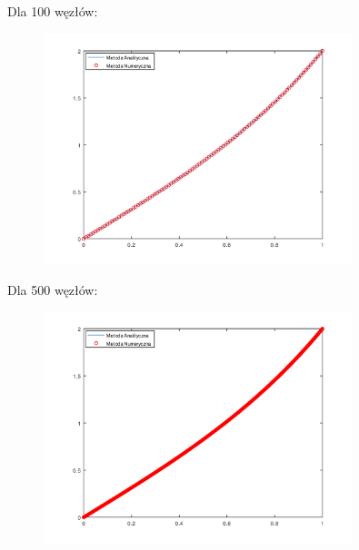 \newpage
\begin{samepage}
    
Dla 100 węzłów:
\begin{figure}[!ht]
    \begin{center}
    \includegraphics[width=0.8\textwidth]{Lab4/charts/zad1/zad1_n_100.png}
    \end{center}
\end{figure}
\FloatBarrier
\end{samepage}
    

    
\begin{samepage}

Dla 500 węzłów:

\begin{figure}[!ht]
    \begin{center}
\includegraphics[width=0.8\textwidth]{Lab4/charts/zad1/zad1_n_500.png}
    \end{center}
\end{figure}
\FloatBarrier
\end{samepage}

